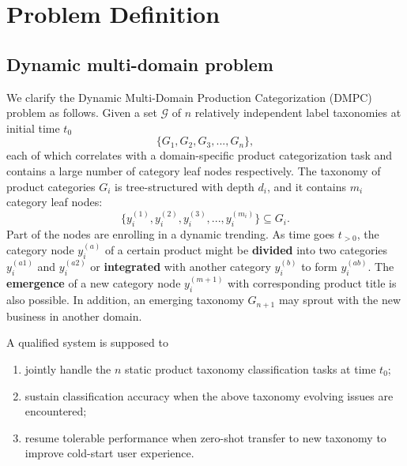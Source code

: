 \section{Problem Definition}
\subsection{Dynamic multi-domain problem}
We clarify the Dynamic Multi-Domain Production Categorization (DMPC) problem as follows. Given a set $\mathcal{G}$ of $n$ relatively independent label taxonomies at initial time $t_0$
$$
\{G_1, G_2, G_3, ..., G_n\},
$$
each of which correlates with a domain-specific product categorization task and contains a large number of category leaf nodes respectively. The taxonomy of product categories $G_i$ is tree-structured with depth $d_i$, and it contains $m_i$ category leaf nodes:
$$
\{y_i^{(1)}, y_i^{(2)}, y_i^{(3)}, ..., y_i^{(m_i)}\} \subseteq G_i.
$$
Part of the nodes are enrolling in a dynamic trending. As time goes $t_{>0}$, the category node $y_i^{(a)}$ of a certain product might be \textbf{divided} into two categories $y_i^{(a1)}$ and $y_i^{(a2)}$ or \textbf{integrated} with another category $y_i^{(b)}$ to form $y_i^{(ab)}$. The \textbf{emergence} of a new category node $y_i^{(m+1)}$ with corresponding product title is also possible.
In addition, an emerging taxonomy $G_{n+1}$ may sprout with the new business in another domain.

A qualified system is supposed to
\begin{enumerate}
    \item jointly handle the $n$ static product taxonomy classification tasks at time $t_0$;
    \item sustain classification accuracy when the above taxonomy evolving issues are encountered;
    \item resume tolerable performance when zero-shot transfer to new taxonomy to improve cold-start user experience.
\end{enumerate}

